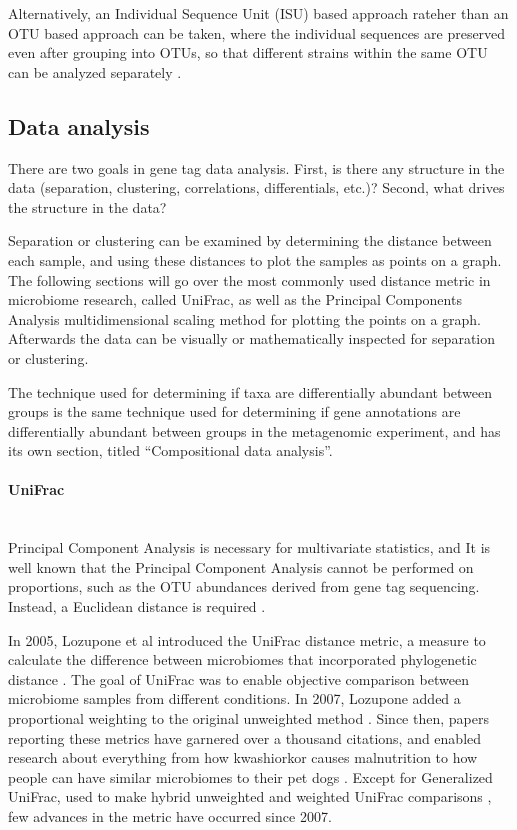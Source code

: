 Alternatively, an Individual Sequence Unit (ISU) based approach rateher than an OTU based approach can be taken, where the individual sequences are preserved even after grouping into OTUs, so that different strains within the same OTU can be analyzed separately \cite{callahan2015dada2}.

\FloatBarrier

\subsection{Data analysis}
There are two goals in gene tag data analysis. First, is there any structure in the data (separation, clustering, correlations, differentials, etc.)? Second, what drives the structure in the data?

Separation or clustering can be examined by determining the distance between each sample, and using these distances to plot the samples as points on a graph. The following sections will go over the most commonly used distance metric in microbiome research, called UniFrac, as well as the Principal Components Analysis multidimensional scaling method for plotting the points on a graph. Afterwards the data can be visually or mathematically inspected for separation or clustering.

The technique used for determining if taxa are differentially abundant between groups is the same technique used for determining if gene annotations are differentially abundant between groups in the metagenomic experiment, and has its own section, titled “Compositional data analysis”.

\paragraph{UniFrac}\mbox{}\\
Principal Component Analysis is necessary for multivariate statistics, and It is well known that the Principal Component Analysis cannot be performed on proportions, such as the OTU abundances derived from gene tag sequencing. Instead, a Euclidean distance is required \cite{anderson2003canonical}.

In 2005, Lozupone et al introduced the UniFrac distance metric, a measure to calculate the difference between microbiomes that incorporated phylogenetic distance \cite{lozupone2005unifrac}. The goal of UniFrac was to enable objective comparison between microbiome samples from different conditions. In 2007, Lozupone added a proportional weighting to the original unweighted method \cite{lozupone2007quantitative}. Since then, papers reporting these metrics have garnered over a thousand citations, and enabled research about everything from how kwashiorkor causes malnutrition \cite{smith2013gut} to how people can have similar microbiomes to their pet dogs \cite{song2013cohabiting}.  Except for Generalized UniFrac, used to make hybrid unweighted and weighted UniFrac comparisons \cite{chen2012associating}, few advances in the metric have occurred since 2007. 

